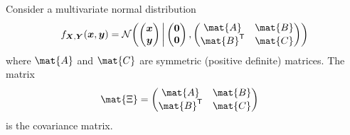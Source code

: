 \documentclass{sotonExamBoxes}    %
\newcommand{\tr}{\textsf{T}}
\begin{document}
\begin{question}{25}
  Consider a multivariate normal distribution
  \begin{align*}
    f_{\bm{X},\bm{Y}}(\bm{x}, \bm{y}) = \mathcal{N}
    \!\left( \begin{pmatrix}\bm{x}\\ \bm{y}\end{pmatrix}
    \,\middle|\, \begin{pmatrix} \bm{0} \\
      \bm{0} \end{pmatrix}, \begin{pmatrix} \mat{A} & \mat{B}\\
      \mat{B}^{\tr} & \mat{C} \end{pmatrix} \right) 
  \end{align*}
  where $\mat{A}$ and $\mat{C}$ are symmetric (positive definite)
  matrices.  The matrix
  \begin{align*}
    \mat{\Xi} &= \begin{pmatrix} \mat{A} & \mat{B}\\ \mat{B}^{\tr} & \mat{C} \end{pmatrix}
  \end{align*}
  is the covariance matrix.


\end{question}
\end{document}
